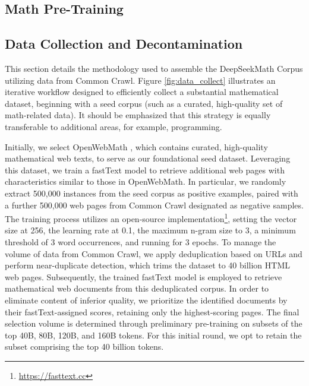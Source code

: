 \begin{itemize}[topsep=0pt]
\section{Math Pre-Training}

\subsection{Data Collection and Decontamination} This section details the methodology used to assemble the DeepSeekMath Corpus utilizing data from Common Crawl. Figure \ref{fig:data_collect} illustrates an iterative workflow designed to efficiently collect a substantial mathematical dataset, beginning with a seed corpus (such as a curated, high-quality set of math-related data). It should be emphasized that this strategy is equally transferable to additional areas, for example, programming.

Initially, we select OpenWebMath \citep{openwebmath}, which contains curated, high-quality mathematical web texts, to serve as our foundational seed dataset. Leveraging this dataset, we train a fastText model \citep{joulin2016fasttext} to retrieve additional web pages with characteristics similar to those in OpenWebMath. In particular, we randomly extract 500,000 instances from the seed corpus as positive examples, paired with a further 500,000 web pages from Common Crawl designated as negative samples. The training process utilizes an open-source implementation\footnote{\url{https://fasttext.cc}}, setting the vector size at 256, the learning rate at 0.1, the maximum n-gram size to 3, a minimum threshold of 3 word occurrences, and running for 3 epochs. To manage the volume of data from Common Crawl, we apply deduplication based on URLs and perform near-duplicate detection, which trims the dataset to 40 billion HTML web pages. Subsequently, the trained fastText model is employed to retrieve mathematical web documents from this deduplicated corpus. In order to eliminate content of inferior quality, we prioritize the identified documents by their fastText-assigned scores, retaining only the highest-scoring pages. The final selection volume is determined through preliminary pre-training on subsets of the top 40B, 80B, 120B, and 160B tokens. For this initial round, we opt to retain the subset comprising the top 40 billion tokens.


\end{itemize}
